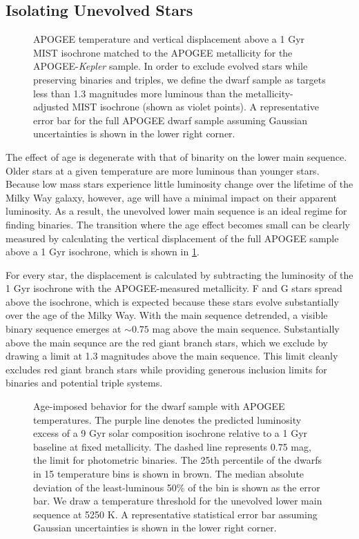 \documentclass[twocolumn]{aastex6}
\newcommand{\Kepler}{\mbox{\textit{Kepler}}}
\begin{document}
\subsection{Isolating Unevolved Stars}
\label{sec:age}

\begin{figure}[htb]
    \centering
    \caption{APOGEE temperature and vertical displacement above a 1 Gyr MIST 
        isochrone matched to the APOGEE metallicity for the APOGEE-\Kepler{} 
        sample.  In order to exclude evolved stars while preserving binaries 
        and triples, we define the dwarf sample as targets less than 1.3 
        magnitudes more luminous than the metallicity-adjusted MIST isochrone 
        (shown as violet points). A representative error bar for the 
        full APOGEE dwarf sample assuming Gaussian uncertainties is shown in 
        the lower right corner.}\label{fig:sample_dk}
\end{figure}

The effect of age is degenerate with that of binarity on the lower main
sequence. Older stars at a given
temperature are more luminous than younger stars. Because low mass stars
experience little luminosity change over the lifetime of the Milky Way galaxy,
however, age will have a minimal impact on their apparent luminosity. As a
result, the unevolved lower main sequence is an ideal regime for finding
binaries. The transition where the age effect becomes small can be clearly
measured by calculating  the vertical displacement of the full APOGEE 
sample above a 1 Gyr isochrone, which is shown in \cref{fig:sample_dk}. 

For every star, the displacement is calculated by subtracting the luminosity 
of the 1 Gyr isochrone with the APOGEE-measured 
metallicity. F and G stars spread above the isochrone, which is 
expected because these stars evolve substantially over the age of the Milky
Way. With the main sequence detrended, a visible binary sequence emerges at 
\(\sim0.75\) mag above the main sequence. Substantially above the main sequnce
are the red giant branch stars, which we exclude by drawing a limit at 1.3 
magnitudes above the main sequence. This limit cleanly excludes red giant 
branch stars while providing generous inclusion limits for binaries and 
potential triple systems.

\begin{figure}[htb]
    \centering
    \caption{Age-imposed behavior for the dwarf sample with APOGEE
        temperatures. The purple line denotes the predicted luminosity excess of 
        a 9 Gyr solar composition isochrone relative to a 1 Gyr baseline at
        fixed metallicity. The dashed line represents 0.75 
        mag, the limit for photometric binaries. The 25th percentile of the 
        dwarfs in 15 temperature bins is shown in brown. The median absolute 
        deviation of the least-luminous 50\% of the bin is shown as the error 
        bar. We draw a temperature threshold for the unevolved lower main 
        sequence at 5250 K. A representative statistical error bar assuming 
        Gaussian uncertainties is shown in the lower right corner.}
    \label{fig:ages}
\end{figure}
\end{document}
